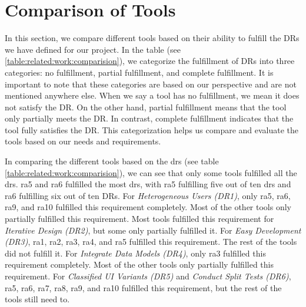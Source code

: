 \clearpage
\section{Comparison of Tools}
\label{section:related-word:comparison}
In this section, we compare different tools based on their ability to fulfill the DRs we have defined for our project. 
In the table (see \ref{table:related:work:comparision}), we categorize the fulfillment of DRs into three categories: no fulfillment, partial fulfillment, and complete fulfillment. 
It is important to note that these categories are based on our perspective and are not mentioned anywhere else. 
When we say a tool has no fulfillment, we mean it does not satisfy the DR. On the other hand, partial fulfillment means that the tool only partially meets the DR. 
In contrast, complete fulfillment indicates that the tool fully satisfies the DR. 
This categorization helps us compare and evaluate the tools based on our needs and requirements.

In comparing the different tools based on the \ac{dr}s (see table \ref{table:related:work:comparision}), we can see that only some tools fulfilled all the \ac{dr}s. 
\ac{ra}5 and \ac{ra}6 fulfilled the most \ac{dr}s, with \ac{ra}5 fulfilling five out of ten \ac{dr}s and \ac{ra}6 fulfilling six out of ten DRs.
For \textit{Heterogeneous Users (DR1)}, only \ac{ra}5, \ac{ra}6, \ac{ra}9, and \ac{ra}10 fulfilled this requirement completely. Most of the other tools only partially fulfilled this requirement.
Most tools fulfilled this requirement for \textit{Iterative Design (DR2)}, but some only partially fulfilled it.
For \textit{Easy Development (DR3)}, \ac{ra}1, \ac{ra}2, \ac{ra}3, \ac{ra}4, and \ac{ra}5 fulfilled this requirement. 
The rest of the tools did not fulfill it.
For \textit{Integrate Data Models (DR4)}, only \ac{ra}3 fulfilled this requirement completely. 
Most of the other tools only partially fulfilled this requirement.
For \textit{Classified UI Variants (DR5)} and \textit{Conduct Split Tests (DR6)}, \ac{ra}5, \ac{ra}6, \ac{ra}7, \ac{ra}8, \ac{ra}9, and \ac{ra}10 fulfilled this requirement, but the rest of the tools still need to.

